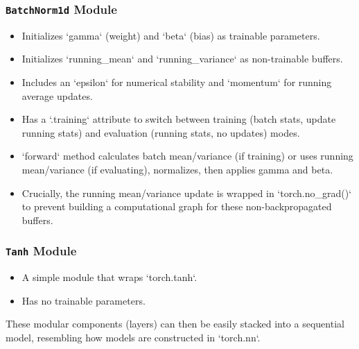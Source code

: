 \subsubsection{\texttt{BatchNorm1d} Module}
\begin{itemize}
    \item Initializes `gamma` (weight) and `beta` (bias) as trainable parameters.
    \item Initializes `running_mean` and `running_variance` as non-trainable buffers.
    \item Includes an `epsilon` for numerical stability and `momentum` for running average updates.
    \item Has a `.training` attribute to switch between training (batch stats, update running stats) and evaluation (running stats, no updates) modes.
    \item `forward` method calculates batch mean/variance (if training) or uses running mean/variance (if evaluating), normalizes, then applies gamma and beta.
    \item Crucially, the running mean/variance update is wrapped in `torch.no_grad()` to prevent building a computational graph for these non-backpropagated buffers.
\end{itemize}

\subsubsection{\texttt{Tanh} Module}
\begin{itemize}
    \item A simple module that wraps `torch.tanh`.
    \item Has no trainable parameters.
\end{itemize}

These modular components (layers) can then be easily stacked into a sequential model, resembling how models are constructed in `torch.nn`.

